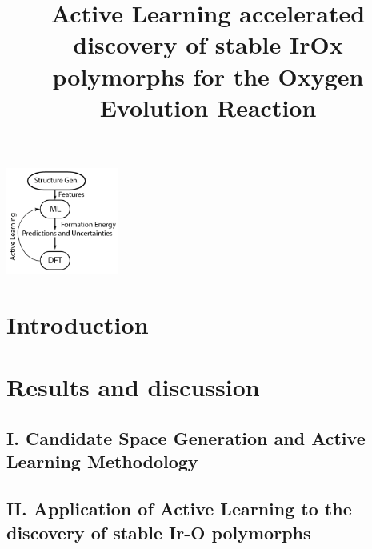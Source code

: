 \documentclass[%
  journal=jacsat,
  manuscript=article,
  ]{achemso}
\title[ML discovered \IrOx phases]{
Active Learning accelerated discovery of stable IrOx polymorphs for the Oxygen Evolution Reaction
}
\begin{document}
\begin{tocentry}
\begin{center}
\includegraphics[height=3.5cm]{02_figures/al_diagram/Surrogate_model}
\end{center}
\end{tocentry}


\begin{abstract}

\end{abstract}

\section{Introduction}


\section{Results and discussion}

  \subsection{I. Candidate Space Generation and Active Learning Methodology}
  

  \subsection{II. Application of Active Learning to the discovery of stable Ir-O polymorphs}
  
\end{document}
